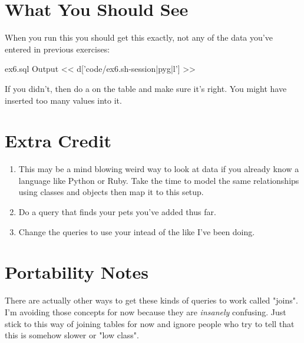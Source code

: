 \section{What You Should See}

When you run this you should get this exactly, not any of the data you've
entered in previous exercises:

\begin{code}{ex6.sql Output}
<< d['code/ex6.sh-session|pyg|l'] >>
\end{code}

If you didn't, then do a  on the  table and
make sure it's right.  You might have inserted too many values into it.


\section{Extra Credit}

\begin{enumerate}
\item This may be a mind blowing weird way to look at data if you already know
    a language like Python or Ruby.  Take the time to model the same relationships
    using classes and objects then map it to this setup.
\item Do a query that finds your pets you've added thus far.
\item Change the queries to use your  intead of the 
     like I've been doing.
\end{enumerate}

\section{Portability Notes}

There are actually other ways to get these kinds of queries to work called
"joins".  I'm avoiding those concepts for now because they are \emph{insanely}
confusing.  Just stick to this way of joining tables for now and ignore people
who try to tell that this is somehow slower or "low class".

